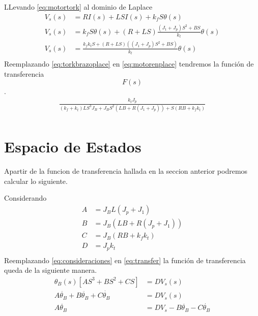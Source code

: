 \documentclass[a4paper]{IEEEtran} %
\begin{document}
LLevando \ref{eq:motortork} al dominio de Laplace 
\begin{equation}
    \begin{split}
        V_{s}(s)&=RI(s)+LSI(s)+k_{f}S\theta(s)\\
        V_{s}(s)&=k_{f}S\theta(s)+(R+LS)\frac{(J_{1}+J_{p})S^2+BS}{k_{t}}\theta(s)\\
        V_{s}(s)&=\frac{k_{f}k_{t}S+(R+LS)((J_{1}+J_{p})S^2+BS)}{k_{t}}\theta(s)\\
    \end{split}
    \label{eq:motorenplace}
\end{equation}
Reemplazando \ref{eq:torkbrazoplace} en \ref{eq:motorenplace} tendremos la función de transferencia$$F(s)$$.
\begin{equation}
    \begin{split}
        \frac{k_{t}J_{p}}{(k_{f}+k_{t})LS^3J_{B}+J_{B}S^2(LB+R(J_{1}+J_{p}))+S(RB+k_{f}k_{t})}\\
    \end{split}
    \label{eq:transfer}
\end{equation}

\section{Espacio de Estados}
Apartir de la funcion de transferencia hallada en la seccion anterior podremos calcular lo siguiente.

Considerando
\begin{equation}
    \begin{split}
        A&=J_{B}L(J_{p}+J_{1})\\
        B&=J_{B}(LB+R(J_{p}+J_{1}))\\
        C&=J_{B}(RB+k_{f}k_{t})\\
        D&=J_{p}k_{t}\\
    \end{split}
    \label{eq:consideraciones}
\end{equation}
Reemplazando \ref{eq:consideraciones} en \ref{eq:transfer} la función de transferencia queda de la siguiente manera.
\begin{equation}
    \begin{split}
        \theta_{B}(s)[AS^3+BS^2+CS]&=DV_{s}(s)\\
        A\ddot{\theta_{B}}+B\ddot{\theta_{B}}+C\dot{\theta_{B}}&=DV_{s}(s)\\
        A\ddot{\theta_{B}}&=DV_{s}-B\ddot{\theta_{B}}-C\dot{\theta_{B}}\\
    \end{split}
    \label{eq:consideraciones}
\end{equation}


\end{document}

